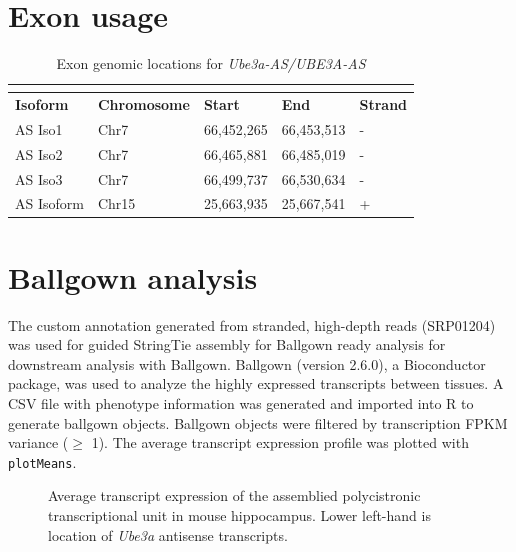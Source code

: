 \section{Exon usage}
\begin{longtabu} {X[1,c]X[1,c]X[1.5,c]X[1.5,c]X[0.5,c]}
  \caption{Exon genomic locations for \textit{Ube3a-AS/UBE3A-AS}}\\
  \label{exon location table}\\
  \toprule
  \textbf{Isoform} & \textbf{Chromosome} & \textbf{Start} & \textbf{End} & \textbf{Strand}\\
  \midrule
  \endhead
  AS Iso1    & Chr7  & 66,452,265 & 66,453,513 & - \\
  AS Iso2    & Chr7  & 66,465,881 & 66,485,019 & - \\
  AS Iso3    & Chr7  & 66,499,737 & 66,530,634 & - \\
  \midrule
  AS Isoform & Chr15 & 25,663,935 & 25,667,541 & + \\
  \bottomrule
\end{longtabu}

\section{Ballgown analysis}
The custom annotation generated from stranded, high-depth reads (SRP01204) was used for guided StringTie assembly for Ballgown ready analysis for downstream analysis with Ballgown. Ballgown \cite{Pertea2016,Fu2016} (version 2.6.0), a Bioconductor package, was used to analyze the highly expressed transcripts between tissues. A CSV file with phenotype information was generated and imported into R to generate ballgown objects. Ballgown objects were filtered by transcription FPKM variance ($\ge$ 1). The average transcript expression profile was plotted with \texttt{plotMeans}.

\begin{figure}
  \centering
  \caption{Average transcript expression of the assemblied polycistronic transcriptional unit in mouse hippocampus. Lower left-hand is location of \textit{Ube3a} antisense transcripts.}
  \label{mean expression-ballgown}
\end{figure}
